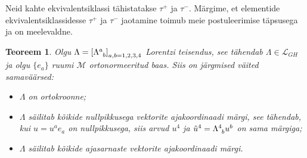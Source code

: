 \documentclass[12pt,a4paper,oneside]{article}
\theoremstyle{plain}
\newtheorem{teoreem}{Teoreem}[section]
\theoremstyle{definition}
\numberwithin{equation}{section}
\def\L{{\mathcal L}}
\def\M{{\mathcal M}}
\begin{document}
Neid kahte ekvivalentsiklassi tähistatakse $\tau^+$ ja $\tau^-$. 
Märgime, et elementide ekvivalentsiklassidesse $\tau^+$ ja $\tau^-$ 
jaotamine toimub meie postuleerimise täpsusega ja on meelevaldne.

\begin{teoreem}\textnormal{\cite[teoreem 1.3.3]{Naber}}
Olgu $\Lambda = \left[\Lambda\indices{^a_b}\right]_{a,b = 1,2,3,4}$ 
Lorentzi teisendus, see tähendab $\Lambda \in \L_{GH}$ ja olgu 
$\{e_a\}$ ruumi $\M$ orto\-normeeritud baas. Siis on järgmised 
väited samaväärsed:
\begin{itemize}
\item[$(i)$] $\Lambda$ on ortokroonne;
\item[$(ii)$] $\Lambda$ säilitab kõikide nullpikkusega vektorite 
ajakoordinaadi märgi, see tähendab, kui $u = u^a e_a$ on 
nullpikkusega, siis arvud $u^4$ ja $\hat{u}^4 = 
\Lambda\indices{^4_b} u^b$ on sama märgiga;
\item[$(iii)$] $\Lambda$ säilitab kõikide ajasarnaste vektorite 
ajakoordinaadi märgi.
\end{itemize}
\end{teoreem}
\end{document}
